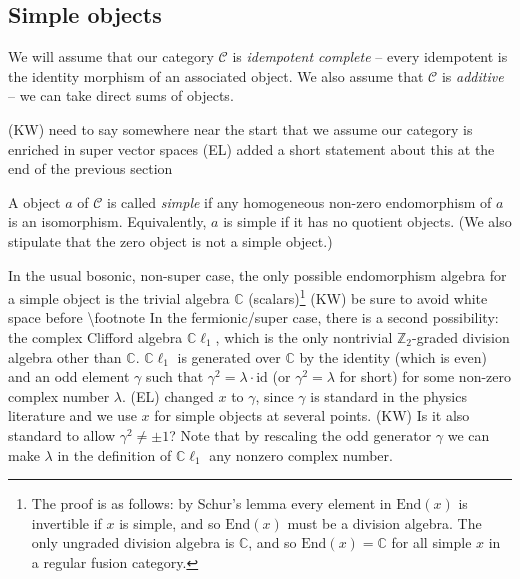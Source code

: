 \documentclass[12pt,a4paper]{article}
\newcommand{\cc}{\mathbb{C}}
\newcommand{\zt}{\mathbb{Z}_2}
\newcommand{\mcc}{\mathcal{C}}
\newcommand{\id}{\text{id}}
\newcommand{\End}{\text{End}}
\newcommand{\cl}{\mathbb{C}\ell}
\newcommand{\ethan}[1]{{\color{amethyst}\footnotesize{(EL) #1}}}
\newcommand{\kw}[1]{{\color{kwcolor}\footnotesize{(KW) #1}}}
\begin{document}
\subsection{Simple objects}

We will assume that our category $\mcc$ is {\it idempotent complete} -- 
every idempotent is the identity morphism of an associated object.
We also assume that $\mcc$ is {\it additive} -- we can take direct sums of objects.

\kw{need to say somewhere near the start that we assume our category is enriched in super vector spaces} \ethan{added a short statement about this at the end of the previous section}

A object $a$ of $\mcc$ is called {\it simple} if any homogeneous non-zero endomorphism of $a$ is an isomorphism.
Equivalently, $a$ is simple if it has no quotient objects.
(We also stipulate that the zero object is not a simple object.)

In the usual bosonic, non-super case, the only possible endomorphism algebra for a simple object
is the trivial algebra $\cc$ (scalars)\footnote{The 
proof is as follows: by Schur's lemma every element in $\End(x)$ is invertible if $x$ is simple, and so $\End(x)$ must be a division algebra. 
The only ungraded division algebra is $\cc$, and so $\End(x) = \cc$ for all simple $x$ in a regular fusion category.}
\kw{be sure to avoid white space before \textbackslash footnote}
In the fermionic/super case, there is a second possibility: the complex Clifford algebra $\cl_1$, which is the only nontrivial $\zt$-graded division algebra other than $\cc$.
$\cl_1$ is generated over $\cc$ by the identity (which is even) and an odd element $\gamma$ such that $\gamma^2 = \lambda \cdot \id$
(or $\gamma^2 = \lambda$ for short) for some non-zero complex number $\lambda$. \ethan{changed $x$ to $\gamma$, since $\gamma$ is standard in the physics literature and we use $x$ for simple objects at several points.}
\kw{Is it also standard to allow $\gamma^2 \ne \pm1$?}
Note that by rescaling the odd generator $\gamma$ we can make $\lambda$ in the definition of $\cl_1$ any nonzero complex number. 
\end{document}
